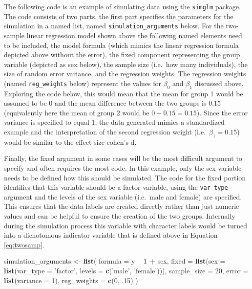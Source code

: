 \documentclass[man,mask,floatsintext]{apa6}
\newenvironment{Shaded}{\begin{snugshade}}{\end{snugshade}}
\newcommand{\DataTypeTok}[1]{\textcolor[rgb]{0.13,0.29,0.53}{#1}}
\newcommand{\DecValTok}[1]{\textcolor[rgb]{0.00,0.00,0.81}{#1}}
\newcommand{\FloatTok}[1]{\textcolor[rgb]{0.00,0.00,0.81}{#1}}
\newcommand{\KeywordTok}[1]{\textcolor[rgb]{0.13,0.29,0.53}{\textbf{#1}}}
\newcommand{\NormalTok}[1]{#1}
\newcommand{\OperatorTok}[1]{\textcolor[rgb]{0.81,0.36,0.00}{\textbf{#1}}}
\newcommand{\StringTok}[1]{\textcolor[rgb]{0.31,0.60,0.02}{#1}}
\begin{document}
The following code is an example of simulating data using the \texttt{simglm} package. The code consists of two parts, the first part specifies the parameters for the simulation in a named list, named \texttt{simulation\_arguments} below. For the two-sample linear regression model shown above the following named elements need to be included, the model formula (which mimics the linear regression formula depicted above without the error), the fixed component representing the group variable (depicted as sex below), the sample size (i.e.~how many individuals), the size of random error variance, and the regression weights. The regression weights (named \texttt{reg\_weights} below) represent the values for \(\beta_{0}\) and \(\beta_{1}\) discussed above. Exploring the code below, this would mean that the mean for group 1 would be assumed to be 0 and the mean difference between the two groups is 0.15 (equivalently here the mean of group 2 would be \(0 + 0.15 = 0.15\)). Since the error variance is specified to equal 1, the data generated mimics a standardized example and the interpretation of the second regression weight (i.e.~\(\beta_{1} = 0.15\)) would be similar to the effect size cohen's d.~

Finally, the fixed argument in some cases will be the most difficult argument to specify and often requires the most code. In this example, only the sex variable needs to be defined how this should be simulated. The code for the fixed portion identifies that this variable should be a factor variable, using the \texttt{var\_type} argument and the levels of the sex variable (i.e.~male and female) are specified. This ensures that the data labels are created directly rather than just numeric values and can be helpful to ensure the creation of the two groups. Internally during the simulation process this variable with character labels would be turned into a dichotomous indicator variable that is defined above in Equation \eqref{eq:twosamp}.

\begin{Shaded}
\begin{Highlighting}[]
\NormalTok{simulation_arguments <-}\StringTok{ }\KeywordTok{list}\NormalTok{(}
  \DataTypeTok{formula =}\NormalTok{ y }\OperatorTok{~}\StringTok{ }\DecValTok{1} \OperatorTok{+}\StringTok{ }\NormalTok{sex,}
  \DataTypeTok{fixed =} \KeywordTok{list}\NormalTok{(}\DataTypeTok{sex =} \KeywordTok{list}\NormalTok{(}\DataTypeTok{var_type =} \StringTok{'factor'}\NormalTok{, }
                            \DataTypeTok{levels =} \KeywordTok{c}\NormalTok{(}\StringTok{'male'}\NormalTok{, }\StringTok{'female'}\NormalTok{))),}
  \DataTypeTok{sample_size =} \DecValTok{20}\NormalTok{,}
  \DataTypeTok{error =} \KeywordTok{list}\NormalTok{(}\DataTypeTok{variance =} \DecValTok{1}\NormalTok{),}
  \DataTypeTok{reg_weights =} \KeywordTok{c}\NormalTok{(}\DecValTok{0}\NormalTok{, }\FloatTok{.15}\NormalTok{)}
\NormalTok{)}
\end{Highlighting}
\end{Shaded}
\end{document}
